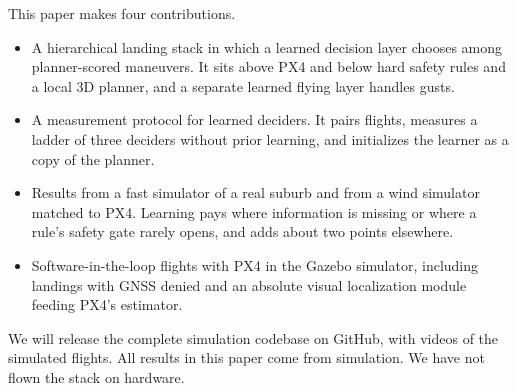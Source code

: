 This paper makes four contributions.
\begin{itemize}
\item A hierarchical landing stack in which a learned decision layer chooses among planner-scored maneuvers. It sits above PX4 and below hard safety rules and a local 3D planner, and a separate learned flying layer handles gusts.
\item A measurement protocol for learned deciders. It pairs flights, measures a ladder of three deciders without prior learning, and initializes the learner as a copy of the planner.
\item Results from a fast simulator of a real suburb and from a wind simulator matched to PX4. Learning pays where information is missing or where a rule's safety gate rarely opens, and adds about two points elsewhere.
\item Software-in-the-loop flights with PX4 in the Gazebo simulator, including landings with GNSS denied and an absolute visual localization module feeding PX4's estimator.
\end{itemize}

We will release the complete simulation codebase on GitHub, with videos of the simulated flights. All results in this paper come from simulation. We have not flown the stack on hardware.

